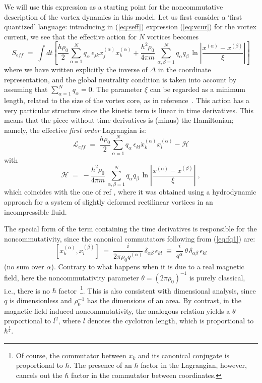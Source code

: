 \documentclass[a4paper,12pt]{article} \tolerance=200
\begin{document}
We will use this expression as a starting point for the noncommutative
description of the vortex dynamics in this model.  Let us first
consider a `first quantized' language: introducing in (\ref{eq:seff})
expression (\ref{eq:vcur}) for the vortex current, we see that the
effective action for $N$ vortices becomes
\begin{equation}\label{eq:fq}
S_{eff}\;=\; \int dt \left[ \frac{h \rho_0}{2} \sum_{\alpha = 1}^N
q_\alpha \, \epsilon_{j k} \dot{x}^{(\alpha)}_j x^{(\alpha)}_k +
\frac{h^2\rho_0}{4\pi m}\, \sum_{\alpha,\beta=1}^N q_\alpha q_\beta \,
\ln |\frac{x^{(\alpha)} - x^{(\beta)}}{\xi}| \right]
\end{equation}
where we have written explicitly the inverse of $\Delta$ in the
coordinate representation, and the global neutrality condition is
taken into account by assuming that $\sum_{\alpha=1}^N q_\alpha =0$. The parameter
$\xi$ can be regarded as a minimum length, related to the size of the
vortex core, as in reference~\cite{HW}. 
This action has a very particular structure since the kinetic term
is linear in time derivatives. This means that the piece without time
derivatives is (minus) the Hamiltonian; namely, the effective {\em
first order\/} Lagrangian is:
\begin{equation}\label{eq:fq1}
{\mathcal L}_{eff}\;=\; \frac{h \rho_0}{2} \sum_{\alpha = 1}^N
q_\alpha \, \epsilon_{kl} \dot{x}^{(\alpha)}_k x^{(\alpha)}_l -
{\mathcal H}
\end{equation}
with
\begin{equation}
{\mathcal H}\;=\; - \frac{h^2\rho_0}{4\pi m}\, \sum_{\alpha,\beta=1}^N q_\alpha q_\beta \, 
\ln |\frac{x^{(\alpha)} - x^{(\beta)}}{\xi}| \;,
\end{equation}
which coincides with the one of  ref \cite{fetter,HW}, where it was obtained using a hydrodynamic approach  for a system of slightly deformed rectilinear vortices in an incompressible fluid.

The special form of the term containing the time derivatives is
responsible for the noncommutativity, since the canonical commutators
following from (\ref{eq:fq1}) are:
\begin{equation}\label{eq:canco}
[x^{(\alpha)}_k , x^{(\beta)}_l] \;=\; \frac{i}{2 \pi \rho_0 q^{(\alpha)}}\, \delta_{\alpha \beta}\, \epsilon_{kl} \;\equiv\;
\frac{i}{q^{\alpha}} \, \theta \, \delta_{\alpha \beta}\,
\epsilon_{kl}
\end{equation}
(no sum over $\alpha$). Contrary to what happens when it is due to a real
magnetic field, here the noncommutativity parameter $\theta=(2\pi \rho_0)^{-1}$
is purely classical, i.e., there is no $\hbar$ factor~\footnote{Of course,
  the commutator between $x_k$ and its canonical conjugate is
  proportional to $\hbar$. The presence of an $\hbar$ factor in the
  Lagrangian, however, cancels out the $\hbar$ factor in the commutator
  between coordinates.}. This is also consistent with dimensional
analysis, since $q$ is dimensionless and $\rho_0^{-1}$ has the dimensions
of an area. By contrast, in the magnetic field induced
noncommutativity, the analogous relation yields a $\theta$ proportional to
$l^2$, where $l$ denotes the cyclotron length, which is proportional
to $\hbar^{\frac{1}{2}}$.
\end{document}
